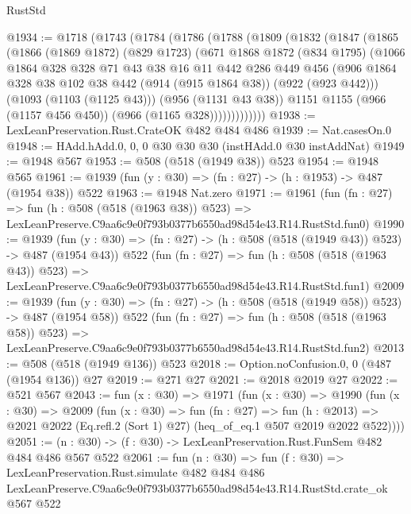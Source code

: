 \begin{lexlean}{RustStd}
\begin{coremodule}
@1934 := @1718
    (@1743
      (@1784
        (@1786
          (@1788
            (@1809
              (@1832
                (@1847
                  (@1865
                    (@1866
                      (@1869 @1872)
                      (@829 @1723)
                      (@671
                        @1868
                        @1872
                        (@834 @1795)
                        (@1066
                          @1864
                          @328
                          @328
                          @71
                          @43
                          @38
                          @16
                          @11
                          @442
                          @286
                          @449
                          @456
                          (@906
                            @1864
                            @328
                            @38
                            @102
                            @38
                            @442
                            (@914 (@915 @1864 @38))
                            (@922 (@923 @442)))
                          (@1093 (@1103 (@1125 @43)))
                          (@956 (@1131 @43 @38))
                          @1151
                          @1155
                          (@966 (@1157 @456 @450))
                          (@966 (@1165 @328)))))))))))))
@1938 := LexLeanPreservation.Rust.CrateOK @482 @484 @486
@1939 := Nat.casesOn.{0}
@1948 := HAdd.hAdd.{0, 0, 0} @30 @30 @30 (instHAdd.{0} @30 instAddNat)
@1949 := @1948 @567
@1953 := @508 (@518 (@1949 @38)) @523
@1954 := @1948 @565
@1961 := @1939 (fun (y : @30) => (fn : @27) -> (h : @1953) -> @487 (@1954 @38)) @522
@1963 := @1948 Nat.zero
@1971 := @1961
    (fun (fn : @27) =>
    fun (h : @508 (@518 (@1963 @38)) @523) =>
    LexLeanPreserve.C9aa6c9e0f793b0377b6550ad98d54e43.R14.RustStd.fun0)
@1990 := @1939
    (fun (y : @30) => (fn : @27) -> (h : @508 (@518 (@1949 @43)) @523) -> @487 (@1954 @43))
    @522
    (fun (fn : @27) =>
    fun (h : @508 (@518 (@1963 @43)) @523) =>
    LexLeanPreserve.C9aa6c9e0f793b0377b6550ad98d54e43.R14.RustStd.fun1)
@2009 := @1939
    (fun (y : @30) => (fn : @27) -> (h : @508 (@518 (@1949 @58)) @523) -> @487 (@1954 @58))
    @522
    (fun (fn : @27) =>
    fun (h : @508 (@518 (@1963 @58)) @523) =>
    LexLeanPreserve.C9aa6c9e0f793b0377b6550ad98d54e43.R14.RustStd.fun2)
@2013 := @508 (@518 (@1949 @136)) @523
@2018 := Option.noConfusion.{0, 0} (@487 (@1954 @136)) @27
@2019 := @271 @27
@2021 := @2018 @2019 @27
@2022 := @521 @567
@2043 := fun (x : @30) =>
  @1971
    (fun (x : @30) =>
    @1990
      (fun (x : @30) =>
      @2009
        (fun (x : @30) =>
        fun (fn : @27) =>
        fun (h : @2013) =>
        @2021 @2022 (Eq.refl.{2} (Sort 1) @27) (heq_of_eq.{1} @507 @2019 @2022 @522))))
@2051 := (n : @30) -> (f : @30) -> LexLeanPreservation.Rust.FunSem @482 @484 @486 @567 @522
@2061 := fun (n : @30) =>
  fun (f : @30) =>
  LexLeanPreservation.Rust.simulate
    @482
    @484
    @486
    LexLeanPreserve.C9aa6c9e0f793b0377b6550ad98d54e43.R14.RustStd.crate_ok
    @567
    @522
\end{coremodule}
\end{lexlean}
